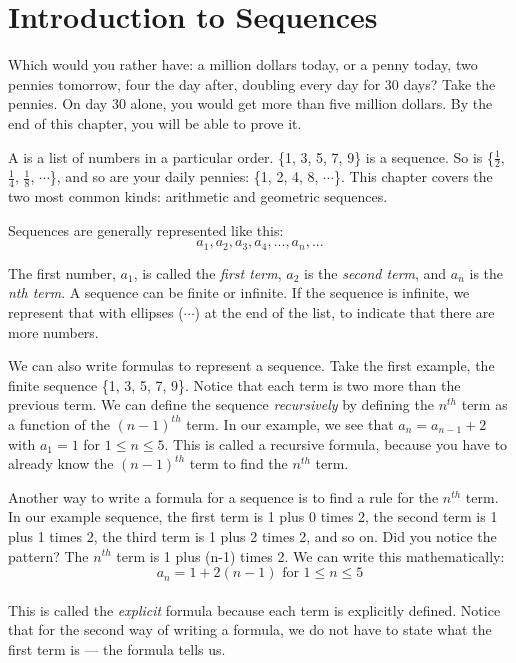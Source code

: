\chapter{Introduction to Sequences}\label{chap:sequences}

Which would you rather have: a million dollars today, or a penny today,
two pennies tomorrow, four the day after, doubling every day for 30 days?
Take the pennies. On day 30 alone, you would get more than five million
dollars. By the end of this chapter, you will be able to prove it.

A  is a list of numbers in a particular
order. \{1, 3, 5, 7, 9\} is a sequence. So is \{$\frac{1}{2}$,
$\frac{1}{4}$, $\frac{1}{8}$, $\cdots$\}, and so are your daily pennies:
\{1, 2, 4, 8, $\cdots$\}. This chapter covers the two most common kinds:
arithmetic and geometric sequences. 

Sequences are generally represented like this:
$$a_1, a_2, a_3, a_4,...,a_n,...$$

The first number, $a_1$, is called the \textit{first term}, $a_2$ is 
the \textit{second term}, and $a_n$ is the \textit{nth term}. A 
sequence can be finite or infinite. If the sequence is infinite, we 
represent that with ellipses ($\cdots$) at the end of the list, to 
indicate that there are more numbers. 

We can also write formulas to represent a sequence. Take the first 
example, the finite sequence \{1, 3, 5, 7, 9\}. Notice that each term 
is two more than the previous term. We can define the sequence
\textit{recursively} by defining the $n^{th}$ term as a function of 
the $(n-1)^{th}$ term. In our example, we see that $a_n = a_{n-1}+2$ 
with $a_1 = 1$ for $1 \leq n \leq 5$. This is called a recursive 
formula, because you have to already know the $(n-1)^{th}$ term to 
find the $n^{th}$ term. 

Another way to write a formula for a sequence is to find a rule for 
the $n^{th}$ term. In our example sequence, the first term is 1 plus 
0 times 2, the second term is 1 plus 1 times 2, the third term is 1 
plus 2 times 2, and so on. Did you notice the pattern? The $n^{th}$ 
term is 1 plus (n-1) times 2. We can write this mathematically: $$a_n 
= 1 + 2(n-1)\text{ for } 1 \leq n \leq 5$$\\ 
This is called the \textit{explicit} formula because each term is 
explicitly defined. Notice that for the second way of writing a formula, 
we do not have to state what the first term is --- the formula tells us. 


